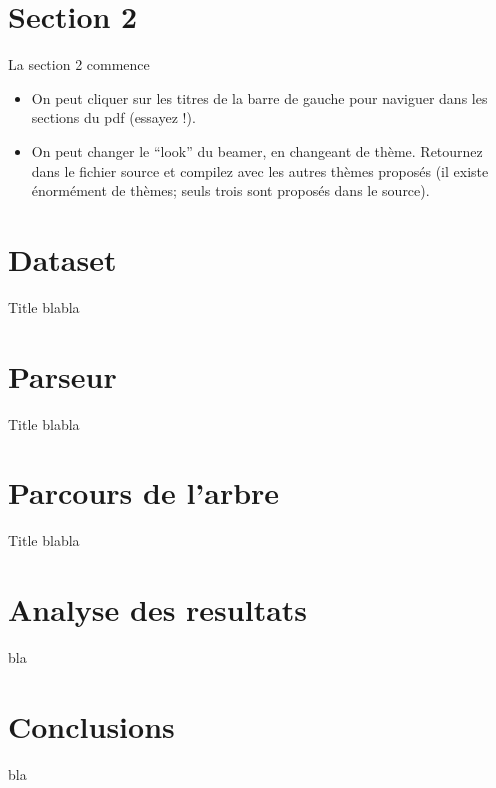 \documentclass[french]{beamer}
\begin{document}
\section{Section 2}
\begin{frame}{La section 2 commence}
  \begin{itemize}
    \item<1-> On peut cliquer sur les titres de la barre de gauche pour naviguer dans les sections du pdf (essayez !).
    \item<2-> On peut changer le ``look'' du beamer, en changeant de thème. Retournez dans le fichier source et compilez avec les autres thèmes proposés (il existe énormément de thèmes; seuls trois sont proposés dans le source).
  \end{itemize}

\end{frame}

\section{Dataset}
\begin{frame}{Title}
  blabla
\end{frame}

\section{Parseur}
\begin{frame}{Title}
  blabla
\end{frame}

\section{Parcours de l'arbre}
\begin{frame}{Title}
  blabla
\end{frame}

\section{Analyse des resultats}
\begin{frame}
  bla
\end{frame}

\section{Conclusions}
\begin{frame}
  bla
\end{frame}
\end{document}
